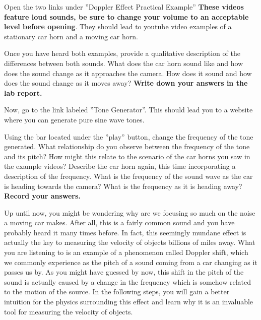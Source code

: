 \begin{steps}
	\item Open the two links under ''Doppler Effect Practical Example'' \textbf{These videos feature loud sounds, be sure to change your volume to an acceptable level before opening}. They should lead to youtube video examples of a stationary car horn and a moving car horn.
	
	\item Once you have heard both examples, provide a qualitative description of the differences between both sounds. What does the car horn sound like and how does the sound change as it approaches the camera. How does it sound and how does the sound change as it moves away? \textbf{Write down your answers in the lab report.} %
	
	\item Now, go to the link labeled ''Tone Generator''. This should lead you to a website where you can generate pure sine wave tones.
	
	\item Using the bar located under the ''play'' button, change the frequency of the tone generated. What relationship do you observe between the frequency of the tone and its pitch? How might this relate to the scenario of the car horns you saw in the example videos? Describe the car horn again, this time incorporating a description of the frequency. What is the frequency of the sound wave as the car is heading towards the camera? What is the frequency as it is heading away? \textbf{Record your answers.}
	
\end{steps}
	Up until now, you might be wondering  why are we focusing so much on the noise a moving car makes. After all, this is a fairly common sound and you have probably heard it many times before. In fact, this seemingly mundane effect is actually the key to measuring the velocity of objects billions of miles away. What you are listening to is an example of a phenomenon called Doppler shift, which we commonly experience as the pitch of a sound coming from a car changing as it passes us by. As you might have guessed by now, this shift in the pitch of the sound is actually caused by a change in the frequency which is somehow related to the motion of the source. In the following steps, you will gain a better intuition for the physics surrounding this effect and learn why it is an invaluable tool for measuring the velocity of objects.
	
